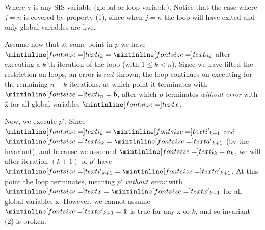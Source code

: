 Where \ms v is any SIS variable (global or loop variable). Notice that the case
where $j = n$ is covered by property (1), since when $j = n$ the loop will have
exited and only global variables are live.

\bigskip

Assume now that at some point in $p$ we have $\ms i_k = \ms a_k$ after executing
a $k$'th iteration of the loop (with $1 \leq k < n$). Since we have lifted the
restriction on loops, an error is \emph{not} thrown; the loop continues on
executing for the remaining $n - k$ iterations, at which point it
terminates with $\ms{i}_n = \hat{\texttt{b}}$, after which $p$ terminates
\emph{without error} with $\hat{\texttt{x}}$ for all global variables $\ms{x}$.

\medskip

Now, we execute $p'$. Since $\ms i_k = \ms{i'}_{k + 1}$ and $\ms a_k =
\ms{a'}_{k + 1}$ (by the invariant), and because we assumed $\ms i_k =
a_k$, we will after iteration $(k + 1)$ of $p'$ have $\ms{i'}_{k + 1} =
\ms{a'}_{k + 1}$. At this point the loop terminates, meaning $p'$ \emph{without
error} with $\ms x = \ms{x'}_{k + 1}$ for all global variables \ms x. However,
we cannot assume $\ms {x'}_{k + 1} = \hat{\texttt{x}}$ is true for any \ms x or
$k$, and so invariant (2) is broken.

\sectend


